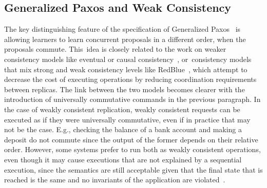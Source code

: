 \documentclass[algorithms,article,accept,moreauthors,pdftex,10pt,a4paper]{Definitions/mdpi}
\begin{document}
\subsection{Generalized Paxos and Weak Consistency}
The key distinguishing feature of the specification of Generalized
Paxos~\cite{Lamport2005} is allowing learners to learn concurrent
proposals in a different order, when the proposals commute. This~idea
is closely related to the work on weaker consistency models like eventual or
causal consistency~\cite{Ahamad1995}, or~consistency models that mix
strong and weak consistency levels like RedBlue~\cite{Li2012}, which attempt
to decrease the cost of executing operations by reducing coordination
requirements between replicas. 
The link between the two models becomes clearer with the introduction of 
universally commutative commands in the previous paragraph.
In the case of weakly consistent replication,
weakly consistent requests can be executed as if they were universally
commutative, even if in practice that may not be the case. E.g., checking 
the balance of a bank account and making a deposit do not commute since
the output of the former depends on their relative order. However,
some systems prefer to run both as weakly consistent operations, even
though it may cause executions that are not explained by a sequential
execution, since the semantics are still acceptable given
that the final state that is reached is the same and no invariants 
of the application are violated~\cite{Li2012}.





\end{document}
